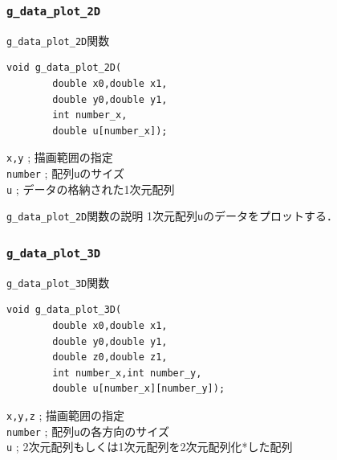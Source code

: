 \documentclass[a4paper,12pt]{jsarticle}%
\begin{document}
\clearpage
\subsubsection{\texttt{g\_data\_plot\_2D}}

\begin{itembox}[l]{\texttt{g\_data\_plot\_2D}関数}
\begin{verbatim}
void g_data_plot_2D(
        double x0,double x1,
        double y0,double y1,
        int number_x,
        double u[number_x]);
\end{verbatim}
\verb|x,y| ; 描画範囲の指定\\
\verb|number| ; 配列\verb|u|のサイズ\\
\verb|u| ; データの格納された1次元配列
\end{itembox}

\begin{itembox}[l]{\texttt{g\_data\_plot\_2D}関数の説明}
1次元配列\verb|u|のデータをプロットする．
\end{itembox}





\clearpage
\subsubsection{\texttt{g\_data\_plot\_3D}}

\begin{itembox}[l]{\texttt{g\_data\_plot\_3D}関数}
\begin{verbatim}
void g_data_plot_3D(
        double x0,double x1,
        double y0,double y1,
        double z0,double z1,
        int number_x,int number_y,
        double u[number_x][number_y]);
\end{verbatim}
\verb|x,y,z| ; 描画範囲の指定\\
\verb|number| ; 配列\verb|u|の各方向のサイズ\\
\verb|u| ; 2次元配列もしくは1次元配列を2次元配列化*した配列
\end{itembox}
\end{document}

